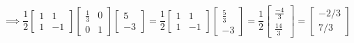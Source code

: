 \documentclass{article}
\begin{document}
$$
\implies
\frac{1}{2}
\begin{bmatrix}
1 & 1 \\
1 & -1
\end{bmatrix}
\begin{bmatrix}
\frac{1}{3} & 0 \\
0 & 1
\end{bmatrix}
\begin{bmatrix}
5 \\
-3
\end{bmatrix}
=
\frac{1}{2}
\begin{bmatrix}
1 & 1 \\
1 & -1
\end{bmatrix}
\begin{bmatrix}
\frac{5}{3} \\
-3
\end{bmatrix}
=
\frac{1}{2}
\begin{bmatrix}
\frac{-4}{3} \\
\frac{14}{3}
\end{bmatrix}
=
\begin{bmatrix}
-2 / 3 \\
7 /3
\end{bmatrix}
$$



\newpage
\end{document}
